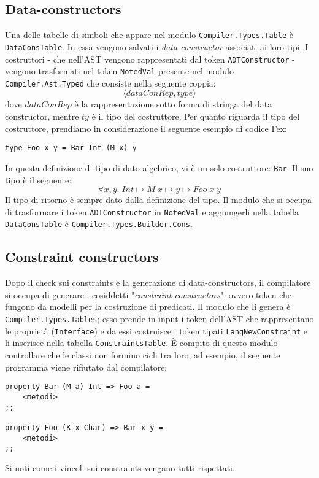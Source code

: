 \documentclass[10pt,a4paper]{article}
\begin{document}
\hypertarget{Data-constructors}{\subsection{Data-constructors}}
Una delle tabelle di simboli che appare nel modulo \texttt{Compiler.Types.Table} è \texttt{DataConsTable}. In essa
vengono salvati i \textit{data constructor} associati ai loro tipi. I costruttori - che nell'AST vengono rappresentati
dal token \texttt{ADTConstructor} - vengono trasformati nel token \texttt{NotedVal} presente nel modulo
\texttt{Compiler.Ast.Typed} che consiste nella seguente coppia:
\[ \langle dataConRep, type \rangle \]
dove $ dataConRep $ è la rappresentazione sotto forma di stringa del data constructor, mentre $ ty $ è il tipo del
costruttore. Per quanto riguarda il tipo del costruttore, prendiamo in considerazione il seguente esempio di codice
Fex:
\begin{lstlisting}
type Foo x y = Bar Int (M x) y
\end{lstlisting}
In questa definizione di tipo di dato algebrico, vi è un solo costruttore: \texttt{Bar}. Il suo tipo è il seguente:
\[ \forall x, y. \; Int \mapsto M \; x \mapsto y \mapsto Foo \; x \; y \]
Il tipo di ritorno è sempre dato dalla definizione del tipo. Il modulo che si occupa di trasformare i token
\texttt{ADTConstructor} in \texttt{NotedVal} e aggiungerli nella tabella \texttt{DataConsTable} è
\texttt{Compiler.Types.Builder.Cons}.

\hypertarget{Constraint constructors}{\subsection{Constraint constructors}}
Dopo il check sui constraints e la generazione di data-constructors, il compilatore si occupa di generare i cosiddetti
"\textit{constraint constructors}", ovvero token che fungono da modelli per la costruzione di predicati. Il modulo
che li genera è \texttt{Compiler.Types.Tables}; esso prende in input i token dell'AST che rappresentano le proprietà
(\texttt{Interface}) e da essi costruisce i token tipati \texttt{LangNewConstraint} e li inserisce nella tabella
\texttt{ConstraintsTable}. \`E compito di questo modulo controllare che le classi non formino cicli tra loro, ad
esempio, il seguente programma viene rifiutato dal compilatore:
\begin{lstlisting}
property Bar (M a) Int => Foo a =
    <metodi>
;;

property Foo (K x Char) => Bar x y =
    <metodi>
;;
\end{lstlisting}
Si noti come i vincoli sui constraints vengano tutti rispettati.
\end{document}
